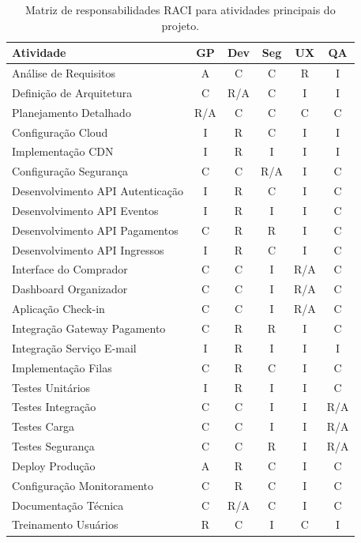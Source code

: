 \begin{table}[H]
\centering
\caption{Matriz de responsabilidades RACI para atividades principais do projeto.}%
\label{tab:raci}
\footnotesize
\begin{tabular}{|p{5cm}|c|c|c|c|c|}
\hline
\textbf{Atividade} & \textbf{GP} & \textbf{Dev} & \textbf{Seg} & \textbf{UX} & \textbf{QA} \\ \hline
Análise de Requisitos & A & C & C & R & I \\ \hline
Definição de Arquitetura & C & R/A & C & I & I \\ \hline
Planejamento Detalhado & R/A & C & C & C & C \\ \hline
Configuração Cloud & I & R & C & I & I \\ \hline
Implementação CDN & I & R & I & I & I \\ \hline
Configuração Segurança & C & C & R/A & I & C \\ \hline
Desenvolvimento API Autenticação & I & R & C & I & C \\ \hline
Desenvolvimento API Eventos & I & R & I & I & C \\ \hline
Desenvolvimento API Pagamentos & C & R & R & I & C \\ \hline
Desenvolvimento API Ingressos & I & R & C & I & C \\ \hline
Interface do Comprador & C & C & I & R/A & C \\ \hline
Dashboard Organizador & C & C & I & R/A & C \\ \hline
Aplicação Check-in & C & C & I & R/A & C \\ \hline
Integração Gateway Pagamento & C & R & R & I & C \\ \hline
Integração Serviço E-mail & I & R & I & I & I \\ \hline
Implementação Filas & C & R & C & I & C \\ \hline
Testes Unitários & I & R & I & I & C \\ \hline
Testes Integração & C & C & I & I & R/A \\ \hline
Testes Carga & C & C & I & I & R/A \\ \hline
Testes Segurança & C & C & R & I & R/A \\ \hline
Deploy Produção & A & R & C & I & C \\ \hline
Configuração Monitoramento & C & R & C & I & C \\ \hline
Documentação Técnica & C & R/A & C & I & C \\ \hline
Treinamento Usuários & R & C & I & C & I \\ \hline
\end{tabular}
\end{table}

